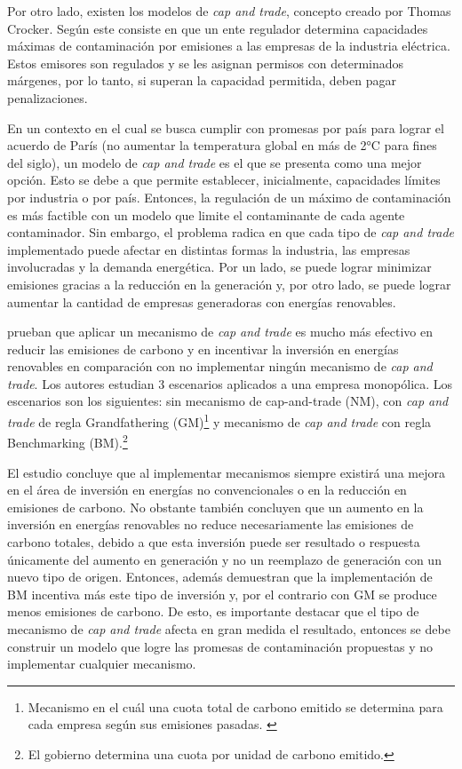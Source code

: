 Por otro lado, existen los modelos de \textit{cap and trade}, concepto creado por Thomas Crocker. Según  este consiste en que un ente regulador determina capacidades máximas de contaminación por emisiones a las empresas de la industria eléctrica. Estos emisores son regulados y se les asignan permisos con determinados márgenes, por lo tanto, si superan la capacidad permitida, deben pagar penalizaciones.
\vspace{2.5mm}

En un contexto en el cual se busca cumplir con promesas por país para lograr el acuerdo de París (no aumentar la temperatura global en más de 2°C para fines del siglo), un modelo de \textit{cap and trade} es el que se presenta como una mejor opción. Esto se debe a que permite establecer, inicialmente, capacidades límites por industria o por país. Entonces, la regulación de un máximo de contaminación es más factible con un modelo que limite el contaminante de cada agente contaminador. Sin embargo, el problema radica en que cada tipo de \textit{cap and trade} implementado puede afectar en distintas formas la industria, las empresas involucradas y la demanda energética. Por un lado, se puede lograr minimizar emisiones gracias a la reducción en la generación y, por otro lado, se puede lograr aumentar la cantidad de empresas generadoras con energías renovables.
\vspace{2.5mm}

 prueban que aplicar un mecanismo de \textit{cap and trade} es mucho más efectivo en reducir las emisiones de carbono y en incentivar la inversión en energías renovables en comparación con no implementar ningún mecanismo de \textit{cap and trade}. Los autores estudian 3 escenarios aplicados a una empresa monopólica. Los escenarios son los siguientes: sin mecanismo de cap-and-trade (NM), con \textit{cap and trade} de regla Grandfathering (GM)\footnote{Mecanismo en el cuál una cuota total de carbono emitido  se determina para cada empresa según sus emisiones pasadas. \cite{chen_renewable_2021}} y mecanismo de \textit{cap and trade} con regla Benchmarking (BM).\footnote{El gobierno determina una cuota por unidad de carbono emitido.\cite{chen_renewable_2021}} 
\vspace{2.5mm}

El estudio concluye que al implementar mecanismos siempre existirá una mejora en el área de inversión en energías no convencionales o en la reducción en emisiones de carbono. No obstante también concluyen que un aumento en la inversión en energías renovables no reduce necesariamente las emisiones de carbono totales, debido a que esta inversión puede ser resultado o respuesta únicamente del aumento en generación y no un reemplazo de generación con un nuevo tipo de origen. Entonces, además demuestran que la implementación de BM incentiva más este tipo de inversión y, por el contrario con GM se produce menos emisiones de carbono. De esto, es importante destacar que el tipo de mecanismo de \textit{cap and trade} afecta en gran medida el resultado, entonces se debe construir un modelo que logre las promesas de contaminación propuestas y no implementar cualquier mecanismo. 
\vspace{2.5mm}

